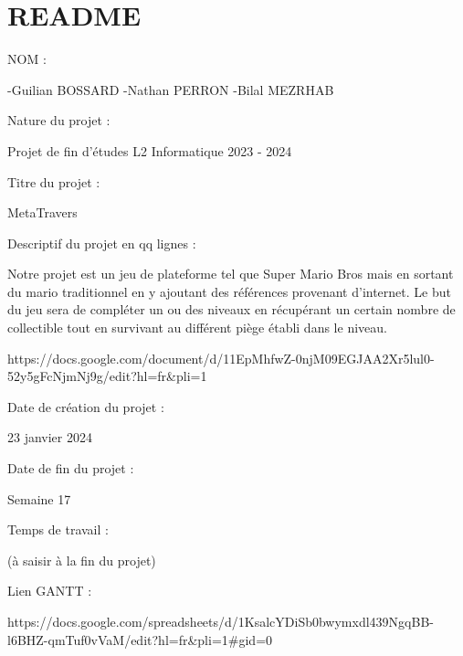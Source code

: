 \chapter{README}
\hypertarget{md_Save_2README}{}\label{md_Save_2README}
NOM \+: \begin{DoxyVerb}-Guilian BOSSARD
-Nathan PERRON
-Bilal MEZRHAB
\end{DoxyVerb}
 Nature du projet \+: \begin{DoxyVerb}Projet de fin d'études L2 Informatique 2023 - 2024
\end{DoxyVerb}
 Titre du projet \+: \begin{DoxyVerb}MetaTravers
\end{DoxyVerb}
 Descriptif du projet en qq lignes \+: \begin{DoxyVerb}Notre projet est un jeu de plateforme tel que Super Mario Bros mais en sortant du mario traditionnel en y ajoutant des références provenant d'internet. 
Le but du jeu sera de compléter un ou des niveaux en récupérant un certain nombre de collectible tout en survivant au différent piège établi dans le niveau.


https://docs.google.com/document/d/11EpMhfwZ-0njM09EGJAA2Xr5lul0-52y5gFcNjmNj9g/edit?hl=fr&pli=1 
\end{DoxyVerb}


Date de création du projet \+: \begin{DoxyVerb}23 janvier 2024
\end{DoxyVerb}


Date de fin du projet \+: \begin{DoxyVerb}Semaine 17
\end{DoxyVerb}


Temps de travail \+: \begin{DoxyVerb}(à saisir à la fin du projet)
\end{DoxyVerb}


Lien GANTT \+: \begin{DoxyVerb}https://docs.google.com/spreadsheets/d/1KsalcYDiSb0bwymxdl439NgqBB-l6BHZ-qmTuf0vVaM/edit?hl=fr&pli=1#gid=0
\end{DoxyVerb}
 